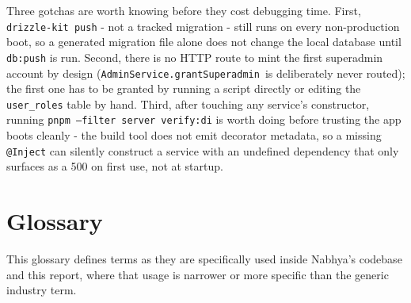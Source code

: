 \noindent Three gotchas are worth knowing before they cost debugging time. First, \texttt{drizzle-kit push} - not a tracked migration - still runs on every non-production boot, so a generated migration file alone does not change the local database until \texttt{db:push} is run. Second, there is no HTTP route to mint the first superadmin account by design (\texttt{AdminService.\allowbreak grantSuperadmin}\ is deliberately never routed); the first one has to be granted by running a script directly or editing the \texttt{user\_roles} table by hand. Third, after touching any service's constructor, running \texttt{pnpm --filter\allowbreak\ server\allowbreak\ verify:di} is worth doing before trusting the app boots cleanly - the build tool does not emit decorator metadata, so a missing \texttt{@Inject} can silently construct a service with an undefined dependency that only surfaces as a 500 on first use, not at startup.

\chapter{Glossary}
\label{app:glossary}
This glossary defines terms as they are specifically used inside Nabhya's codebase and this report, where that usage is narrower or more specific than the generic industry term.

